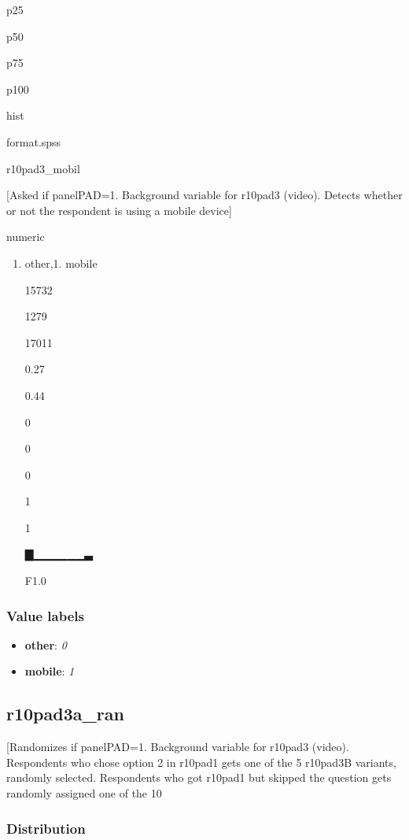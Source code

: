 \documentclass[]{book}
\providecommand{\tightlist}{%
  \setlength{\itemsep}{0pt}\setlength{\parskip}{0pt}}
\begin{document}
p25

p50

p75

p100

hist

format.spss

r10pad3\_mobil

{[}Asked if panelPAD=1. Background variable for r10pad3 (video). Detects
whether or not the respondent is using a mobile device{]}

numeric

\begin{enumerate}
\def\labelenumi{\arabic{enumi}.}
\setcounter{enumi}{-1}
\tightlist
\item
  other,1. mobile

  15732

  1279

  17011

  0.27

  0.44

  0

  0

  0

  1

  1

  ▇▁▁▁▁▁▁▃

  F1.0
\end{enumerate}

\subsubsection{Value labels}\label{r10pad3_mobil_labels}

\begin{itemize}
\tightlist
\item
  \textbf{other}: \emph{0}
\item
  \textbf{mobile}: \emph{1}
\end{itemize}

\subsection{r10pad3a\_ran}\label{r10pad3a_ran}

{[}Randomizes if panelPAD=1. Background variable for r10pad3 (video).
Respondents who chose option 2 in r10pad1 gets one of the 5 r10pad3B
variants, randomly selected. Respondents who got r10pad1 but skipped the
question gets randomly assigned one of the 10

\subsubsection{Distribution}\label{r10pad3a_ran_distribution}
\end{document}

